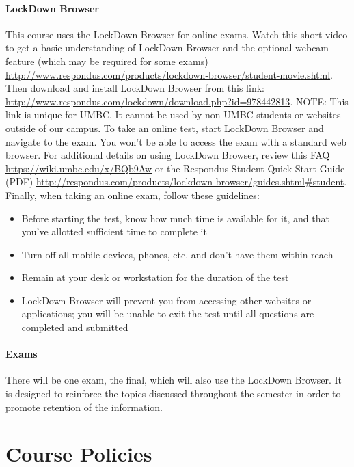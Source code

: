 \documentclass[letter,11pt]{article}
\begin{document}
\paragraph{LockDown Browser}This course uses the LockDown Browser for online exams. Watch this short video to get a basic understanding of LockDown Browser and the optional webcam feature (which may be required for some exams) \url{http://www.respondus.com/products/lockdown-browser/student-movie.shtml}. Then download and install LockDown Browser from this link: \url{http://www.respondus.com/lockdown/download.php?id=978442813}. NOTE: This link is unique for UMBC. It cannot be used by non-UMBC students or websites outside of our campus. To take an online test, start LockDown Browser and navigate to the exam. You won't be able to access the exam with a standard web browser. For additional details on using LockDown Browser, review this FAQ \url{https://wiki.umbc.edu/x/BQb9Aw} or the Respondus Student Quick Start Guide (PDF) \url{http://respondus.com/products/lockdown-browser/guides.shtml#student}. Finally, when taking an online exam, follow these guidelines:
\begin{itemize}
\item Before starting the test, know how much time is available for it, and that you've allotted sufficient time to complete it
\item Turn off all mobile devices, phones, etc. and don't have them within reach
\item Remain at your desk or workstation for the duration of the test
\item LockDown Browser will prevent you from accessing other websites or applications; you will be unable to exit the test until all questions are completed and submitted
\end{itemize}

\paragraph{Exams}There will be one exam, the final, which will also use the LockDown Browser. It is designed to reinforce the topics discussed throughout the semester in order to promote retention of the information.

\section*{Course Policies}
\end{document}
